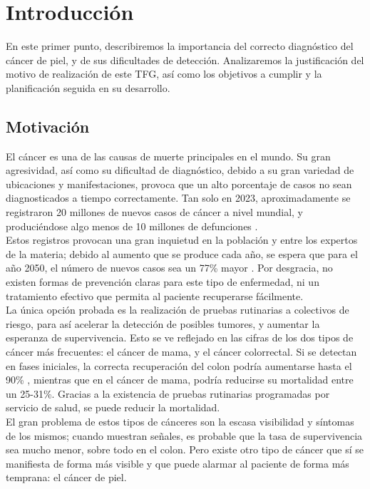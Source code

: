 \chapter{Introducción}

En este primer punto, describiremos la importancia del correcto diagnóstico del cáncer de piel, y de sus dificultades de detección. Analizaremos la justificación del motivo de realización de este TFG, así como los objetivos a cumplir y la planificación seguida en su desarrollo.

\section{Motivación}

El cáncer es una de las causas de muerte principales en el mundo. Su gran agresividad, así como su dificultad de diagnóstico, debido a su gran variedad de ubicaciones y manifestaciones, provoca que un alto porcentaje de casos no sean diagnosticados a tiempo correctamente. Tan solo en 2023, aproximadamente se registraron 20 millones de nuevos casos de cáncer a nivel mundial, y produciéndose algo menos de 10 millones de defunciones \cite{cancerincidence}.\\

Estos registros provocan una gran inquietud en la población y entre los expertos de la materia; debido al aumento que se produce cada año, se espera que para el año 2050, el número de nuevos casos sea un 77\% mayor \cite{cancerprevision}.  Por desgracia, no existen formas de prevención claras para este tipo de enfermedad, ni un tratamiento efectivo que permita al paciente recuperarse fácilmente. \\

La única opción probada es la realización de pruebas rutinarias a colectivos de riesgo, para así acelerar la detección de posibles tumores, y aumentar la esperanza de supervivencia. Esto se ve reflejado en las cifras de los dos tipos de cáncer más frecuentes: el cáncer de mama, y el cáncer colorrectal. Si se detectan en fases iniciales, la correcta recuperación del colon podría aumentarse hasta el 90\% \cite{coloncancer}, mientras que en el cáncer de mama, podría reducirse su mortalidad entre un 25-31\%. Gracias a la existencia de pruebas rutinarias programadas por servicio de salud, se puede reducir la mortalidad.\\

El gran problema de estos tipos de cánceres son la escasa visibilidad y síntomas de los mismos; cuando muestran señales, es probable que la tasa de supervivencia sea mucho menor, sobre todo en el colon. Pero existe otro tipo de cáncer que sí se manifiesta de forma más visible y que puede alarmar al paciente de forma más temprana: el cáncer de piel.\\

